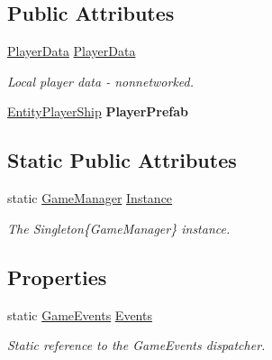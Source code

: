 \subsection*{Public Attributes}
\begin{DoxyCompactItemize}
\item 
\hyperlink{class_skyrates_1_1_data_1_1_player_data}{Player\-Data} \hyperlink{class_skyrates_1_1_game_1_1_game_manager_ad66cf44da1b4400f74853a247987a5df}{Player\-Data}
\begin{DoxyCompactList}\small\item\em Local player data -\/ nonnetworked. \end{DoxyCompactList}\item 
\hypertarget{class_skyrates_1_1_game_1_1_game_manager_a0b253df8947857d6e77732ecdb1353ca}{\hyperlink{class_skyrates_1_1_entity_1_1_entity_player_ship}{Entity\-Player\-Ship} {\bfseries Player\-Prefab}}\label{class_skyrates_1_1_game_1_1_game_manager_a0b253df8947857d6e77732ecdb1353ca}

\end{DoxyCompactItemize}
\subsection*{Static Public Attributes}
\begin{DoxyCompactItemize}
\item 
static \hyperlink{class_skyrates_1_1_game_1_1_game_manager}{Game\-Manager} \hyperlink{class_skyrates_1_1_game_1_1_game_manager_a5b1ce44932689e2e4b3ca18a238cc22e}{Instance}
\begin{DoxyCompactList}\small\item\em The Singleton\{\-Game\-Manager\} instance. \end{DoxyCompactList}\end{DoxyCompactItemize}
\subsection*{Properties}
\begin{DoxyCompactItemize}
\item 
static \hyperlink{class_skyrates_1_1_game_1_1_event_1_1_game_events}{Game\-Events} \hyperlink{class_skyrates_1_1_game_1_1_game_manager_acb90612bc562f5facb3218201154a35a}{Events}
\begin{DoxyCompactList}\small\item\em Static reference to the Game\-Events dispatcher. \end{DoxyCompactList}\end{DoxyCompactItemize}
